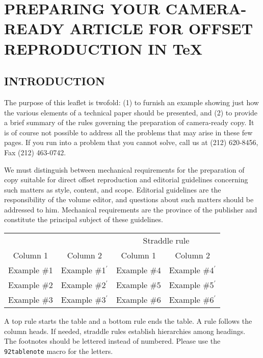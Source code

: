 \documentclass[12pt]{book}
\begin{document}
\chapter{PREPARING YOUR CAMERA-READY ARTICLE FOR OFFSET
REPRODUCTION IN \TeX}

\author{John Q. Editor, Jane Doe, and Richard
Smith}


\section{INTRODUCTION}

The purpose of this leaflet is twofold: (1) to furnish an example
showing just how the various elements of a technical paper should
be presented, and (2) to provide a brief summary of the rules
governing the preparation of camera-ready copy. It is of course not
possible to address all the problems that may arise in these few
pages. If you run into a problem that you cannot solve, call us at
(212) 620-8456, Fax (212) 463-0742.

We must distinguish between mechanical requirements for the
preparation of copy suitable for direct offset reproduction and
editorial guidelines concerning such matters as style, content, and
scope. Editorial guidelines are the responsibility of the volume
editor, and questions about such matters should be addressed to
him. Mechanical requirements are the province of the publisher and
constitute the principal subject of these guidelines.

{\begin{tabular}{cccc}
\hline
&&\multicolumn{2}{c}{Straddle rule} \\ \cline{3-4}
Column 1 & Column 2 & Column 1 & Column 2 \\ \hline
Example \#1 & Example \#1$^\prime$ & Example \#4 & Example
\#4$^\prime$ \\
Example \#2 & Example \#2$^\prime$ & Example \#5 & Example
\#5$^\prime$ \\
Example \#3 & Example \#3$^\prime$ & Example \#6 & Example
\#6$^\prime$ \\ \hline
\end{tabular}}
{A top rule starts the table and a bottom rule ends
the table. A rule follows the column heads. If needed, straddle
rules establish hierarchies among headings.\\
The footnotes should be lettered instead of numbered.
Please use the {\tt \char92tablenote} macro for the letters.}
\end{document}
